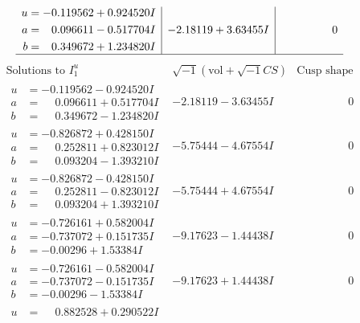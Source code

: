\documentclass[1p]{elsarticle_modified}
\theoremstyle{definition}
\newcommand{\I}{\sqrt{-1}}
\begin{document}
$$\begin{array}{c|c|c}
\begin{aligned}
u &= -0.119562 + 0.924520 I \\
a &= \phantom{-}0.096611 - 0.517704 I \\
b &= \phantom{-}0.349672 + 1.234820 I\end{aligned}
 & -2.18119 + 3.63455 I & \phantom{-0.000000 } 0\\
 \hline 
 \end{array}$$\newpage$$\begin{array}{c|c|c}  
\text{Solutions to }I^u_{1}& \I (\text{vol} + \sqrt{-1}CS) & \text{Cusp shape}\\
 \hline 
\begin{aligned}
u &= -0.119562 - 0.924520 I \\
a &= \phantom{-}0.096611 + 0.517704 I \\
b &= \phantom{-}0.349672 - 1.234820 I\end{aligned}
 & -2.18119 - 3.63455 I & \phantom{-0.000000 } 0 \\ \hline\begin{aligned}
u &= -0.826872 + 0.428150 I \\
a &= \phantom{-}0.252811 + 0.823012 I \\
b &= \phantom{-}0.093204 - 1.393210 I\end{aligned}
 & -5.75444 - 4.67554 I & \phantom{-0.000000 } 0 \\ \hline\begin{aligned}
u &= -0.826872 - 0.428150 I \\
a &= \phantom{-}0.252811 - 0.823012 I \\
b &= \phantom{-}0.093204 + 1.393210 I\end{aligned}
 & -5.75444 + 4.67554 I & \phantom{-0.000000 } 0 \\ \hline\begin{aligned}
u &= -0.726161 + 0.582004 I \\
a &= -0.737072 + 0.151735 I \\
b &= -0.00296 + 1.53384 I\end{aligned}
 & -9.17623 - 1.44438 I & \phantom{-0.000000 } 0 \\ \hline\begin{aligned}
u &= -0.726161 - 0.582004 I \\
a &= -0.737072 - 0.151735 I \\
b &= -0.00296 - 1.53384 I\end{aligned}
 & -9.17623 + 1.44438 I & \phantom{-0.000000 } 0 \\ \hline\begin{aligned}
u &= \phantom{-}0.882528 + 0.290522 I \\

\end{aligned}
\end{array}$$
\end{document}
